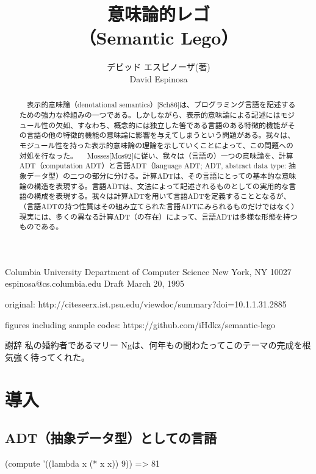 \documentclass[11pt, oneside]{jsarticle}   	%
\title{意味論的レゴ\\
（Semantic Lego）
}
\author{デビッド エスピノーザ(著)\\
David Espinosa
}
\begin{document}
\maketitle


Columbia University
Department of Computer Science
New York, NY 10027
espinosa@cs.columbia.edu
Draft March 20, 1995

original: http://citeseerx.ist.psu.edu/viewdoc/summary?doi=10.1.1.31.2885

figures including sample codes: https://github.com/iHdkz/semantic-lego

\begin{abstract}
　表示的意味論（denotational semantics）[Sch86]は、プログラミング言語を記述するための強力な枠組みの一つである。しかしながら、表示的意味論による記述にはモジュール性の欠如、すなわち、概念的には独立した筈である言語のある特徴的機能がその言語の他の特徴的機能の意味論に影響を与えてしまうという問題がある。我々は、モジュール性を持った表示的意味論の理論を示していくことによって、この問題への対処を行なった。
　Mosses[Mos92]に従い、我々は（言語の）一つの意味論を、計算ADT（computation ADT）と言語ADT（language ADT; ADT, abstract data type: 抽象データ型）の二つの部分に分ける。計算ADTは、その言語にとっての基本的な意味論の構造を表現する。言語ADTは、文法によって記述されるものとしての実用的な言語の構成を表現する。我々は計算ADTを用いて言語ADTを定義することとなるが、（言語ADTの持つ性質はその組み立てられた言語ADTにみられるものだけではなく）現実には、多くの異なる計算ADT（の存在）によって、言語ADTは多様な形態を持つものである。
\end{abstract}
\tableofcontents

謝辞
私の婚約者であるマリー Ngは、何年もの間わたってこのテーマの完成を根気強く待ってくれた。


\section{導入}
\subsection{ ADT（抽象データ型）としての言語}
(compute '((lambda x (* x x)) 9))
=> 81
\end{document}
